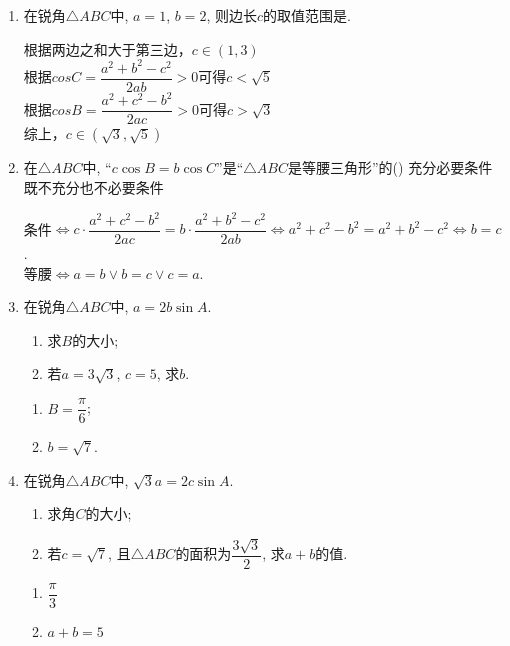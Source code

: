 \begin{enumerate}
\item 在锐角$\triangle{ABC}$中, $a=1$, $b=2$, 则边长$c$的取值范围是. 
\begin{jieda}
    根据两边之和大于第三边，$c \in (1, 3)$ \\
    根据$cosC = \dfrac{a^2+b^2-c^2}{2ab} > 0$可得$c < \sqrt{5}$ \\
    根据$cosB = \dfrac{a^2 + c^2 - b^2}{2ac} > 0$可得$c > \sqrt{3}$ \\
    综上，$c \in (\sqrt{3}, \sqrt{5})$
\end{jieda}
    
\item 在$\triangle{ABC}$中, ``$c\cos{B}=b\cos{C}$''是``$\triangle{ABC}$是等腰三角形''的\dotfill()
{充分必要条件}{既不充分也不必要条件}
\begin{jieda}
条件$\iff c\cdot\dfrac{a^2+c^2-b^2}{2ac}=b\cdot\dfrac{a^2+b^2-c^2}{2ab}\iff a^2+c^2-b^2=a^2+b^2-c^2\iff b=c$. \\
等腰$\iff a=b\lor b=c\lor c=a$. 
\end{jieda}

\item 在锐角$\triangle{ABC}$中, $a=2b\sin{A}$.
\begin{enumerate}
\item 求$B$的大小; 
\item 若$a=3\sqrt{3}$, $c=5$, 求$b$. 
\end{enumerate}
\begin{jieda}
\begin{enumerate}
\item $B=\dfrac{\pi}{6}$; 
\item $b=\sqrt{7}$. 
\end{enumerate}
\end{jieda}
\item 在锐角$\triangle{ABC}$中, $\sqrt{3}a=2c\sin{A}$. 
\begin{enumerate}
\item 求角$C$的大小;
\item 若$c=\sqrt{7}$, 且$\triangle{ABC}$的面积为$\dfrac{3\sqrt{3}}{2}$, 求$a+b$的值. 
\end{enumerate}
\begin{jieda}
\begin{enumerate}
\item $\dfrac{\pi}{3}$

\item $a+b=5$
\end{enumerate}
\end{jieda}



\end{enumerate}
